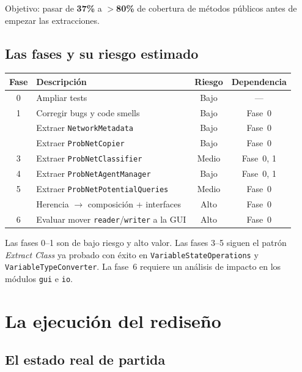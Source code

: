 \documentclass[11pt,a4paper]{article}
\newcommand{\code}[1]{\texttt{#1}}
\begin{document}
Objetivo: pasar de \textbf{37\%} a \textbf{$>$80\%} de cobertura de
métodos públicos antes de empezar las extracciones.

\subsection{Las fases y su riesgo estimado}

\begin{center}
\begin{tabular}{clcc}
\toprule
\textbf{Fase} & \textbf{Descripción} & \textbf{Riesgo} & \textbf{Dependencia} \\
\midrule
0 & Ampliar tests                    & Bajo  & --- \\
1 & Corregir bugs y code smells      & Bajo  & Fase~0 \\
  & Extraer \code{NetworkMetadata}   & Bajo  & Fase~0 \\
  & Extraer \code{ProbNetCopier}     & Bajo  & Fase~0 \\
3 & Extraer \code{ProbNetClassifier} & Medio & Fase~0, 1 \\
4 & Extraer \code{ProbNetAgentManager} & Bajo & Fase~0, 1 \\
5 & Extraer \code{ProbNetPotentialQueries} & Medio & Fase~0 \\
  & Herencia $\to$ composición + interfaces & Alto & Fase~0 \\
6 & Evaluar mover \code{reader}/\code{writer} a la GUI & Alto & Fase~0 \\
\bottomrule
\end{tabular}
\end{center}

Las fases 0--1 son de bajo riesgo y alto valor.  Las fases 3--5 siguen el
patrón \emph{Extract Class} ya probado con éxito en
\code{VariableStateOperations} y \code{VariableTypeConverter}.  La fase~6
requiere un análisis de impacto en los módulos \code{gui} e \code{io}.

\section{La ejecución del rediseño}
\label{sec:ejecucion}

\subsection{El estado real de partida}
\end{document}
